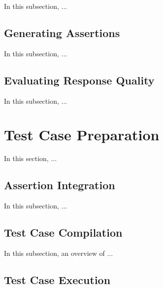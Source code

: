 In this subsection, ...

\vspace{0.1 cm}
\subsection{Generating Assertions}
\label{sec:generating_assertions}
\vspace{0.1 cm}

In this subsection, ...

\vspace{0.1 cm}
\subsection{Evaluating Response Quality}
\label{sec:evaluating_response}
\vspace{0.1 cm}

In this subsection, ...

\section{Test Case Preparation}
\label{sec:test_case_preparation}
\vspace{0.2 cm}

In this section, ...

\vspace{0.1 cm}
\subsection{Assertion Integration}
\label{sec:assertion_integration}
\vspace{0.1 cm}

In this subsection, ...

\vspace{0.1 cm}
\subsection{Test Case Compilation}
\label{sec:test_compilation}
\vspace{0.1 cm}

In this subsection, an overview of ...

\vspace{0.1 cm}
\subsection{Test Case Execution}
\label{sec:test_execution}
\vspace{0.1 cm}

